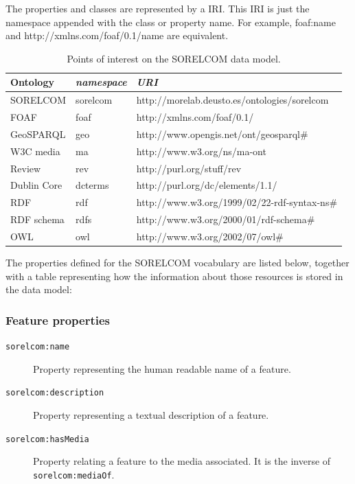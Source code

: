 The properties and classes are represented by a IRI. This IRI is just the namespace appended with the class or property name. For example, foaf:name and http://xmlns.com/foaf/0.1/name are equivalent. 

\begin{table}[ht]
  \centering
  \caption{Points of interest on the SORELCOM data model.}\label{tab:namespaces}
  \begin{tabular}{lll}
    \toprule
      \textbf{Ontology} & \emph{namespace}  & \emph{URI}\\
    \midrule
       SORELCOM & sorelcom & http://morelab.deusto.es/ontologies/sorelcom \\
       FOAF & foaf & http://xmlns.com/foaf/0.1/ \\
       GeoSPARQL & geo & http://www.opengis.net/ont/geosparql\#\\
       W3C media & ma & http://www.w3.org/ns/ma-ont\\
       Review & rev & http://purl.org/stuff/rev\\
       Dublin Core & dcterms & http://purl.org/dc/elements/1.1/\\
       RDF & rdf & http://www.w3.org/1999/02/22-rdf-syntax-ns\#\\
       RDF schema & rdfs & http://www.w3.org/2000/01/rdf-schema\#\\
       OWL & owl & http://www.w3.org/2002/07/owl\#\\
    \bottomrule
  \end{tabular}
\end{table}

The properties defined for the SORELCOM vocabulary are listed below, together with a table representing how the information about those resources is stored in the data model:

\subsubsection*{Feature properties}

\begin{description}
\item[\texttt{sorelcom:name}] Property representing the human readable name of a feature. 
\item[\texttt{sorelcom:description}] Property representing a textual description of a feature.
\item[\texttt{sorelcom:hasMedia}] Property relating a feature to the media associated. It is the inverse of \texttt{sorelcom:mediaOf}.
\end{description}

